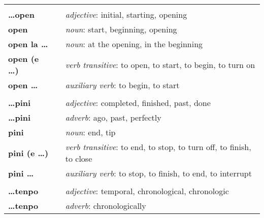\begin{supertabular}{p{2,5cm}|ll}
                             &  &                                                                                  \\ %
    \textbf{\dots open}      &  & \textit{adjective}: initial, starting, opening                                   \\ %
    \textbf{open}            &  & \textit{noun}: start, beginning, opening                                         \\ %
    \textbf{open la \dots}   &  & \textit{noun}: at the opening, in the beginning                                  \\ %
    \textbf{open (e \dots)}  &  & \textit{verb transitive}: to open, to start, to begin, to turn on                \\ %
    \textbf{open \dots }     &  & \textit{auxiliary verb}: to begin, to start                                      \\ %
                             &  &                                                                                  \\ %
    \textbf{\dots pini}      &  & \textit{adjective}: completed, finished, past, done                              \\ %
    \textbf{\dots pini}      &  & \textit{adverb}: ago, past, perfectly                                            \\ %
    \textbf{pini}            &  & \textit{noun}: end, tip                                                          \\ %
    \textbf{pini (e \dots)}  &  & \textit{verb transitive}: to end, to stop, to turn off, to finish, to close      \\ %
    \textbf{pini \dots }     &  & \textit{auxiliary verb}: to stop, to finish, to end, to interrupt                \\ %
                             &  &                                                                                  \\ %
    \textbf{\dots tenpo}     &  & \textit{adjective}: temporal, chronological, chronologic                         \\ %
    \textbf{\dots tenpo}     &  & \textit{adverb}: chronologically                                                 \\ %

\end{supertabular}
